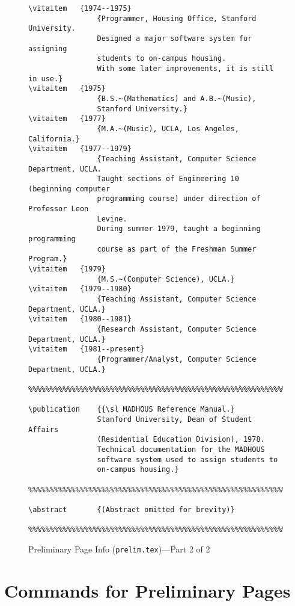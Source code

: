 \begin {figure}
{\small
\begin{verbatim}
\vitaitem   {1974--1975}
                {Programmer, Housing Office, Stanford University.
                Designed a major software system for assigning
                students to on-campus housing.
                With some later improvements, it is still in use.}
\vitaitem   {1975}
                {B.S.~(Mathematics) and A.B.~(Music),
                Stanford University.}
\vitaitem   {1977}
                {M.A.~(Music), UCLA, Los Angeles, California.}
\vitaitem   {1977--1979}
                {Teaching Assistant, Computer Science Department, UCLA.
                Taught sections of Engineering 10 (beginning computer
                programming course) under direction of Professor Leon
                Levine.
                During summer 1979, taught a beginning programming
                course as part of the Freshman Summer Program.}
\vitaitem   {1979}
                {M.S.~(Computer Science), UCLA.}
\vitaitem   {1979--1980}
                {Teaching Assistant, Computer Science Department, UCLA.}
\vitaitem   {1980--1981}
                {Research Assistant, Computer Science Department, UCLA.}
\vitaitem   {1981--present}
                {Programmer/Analyst, Computer Science Department, UCLA.}

%%%%%%%%%%%%%%%%%%%%%%%%%%%%%%%%%%%%%%%%%%%%%%%%%%%%%%%%%%%%%%%%%%%%%%%%

\publication    {{\sl MADHOUS Reference Manual.}
                Stanford University, Dean of Student Affairs
                (Residential Education Division), 1978.
                Technical documentation for the MADHOUS
                software system used to assign students to
                on-campus housing.}

%%%%%%%%%%%%%%%%%%%%%%%%%%%%%%%%%%%%%%%%%%%%%%%%%%%%%%%%%%%%%%%%%%%%%%%%

\abstract       {(Abstract omitted for brevity)}

%%%%%%%%%%%%%%%%%%%%%%%%%%%%%%%%%%%%%%%%%%%%%%%%%%%%%%%%%%%%%%%%%%%%%%%%
\end{verbatim}
}

\caption {Preliminary Page Info ({\tt prelim.tex})---Part 2 of 2}
\label {fig:prelim2}
\end {figure}

\section {Commands for Preliminary Pages}

